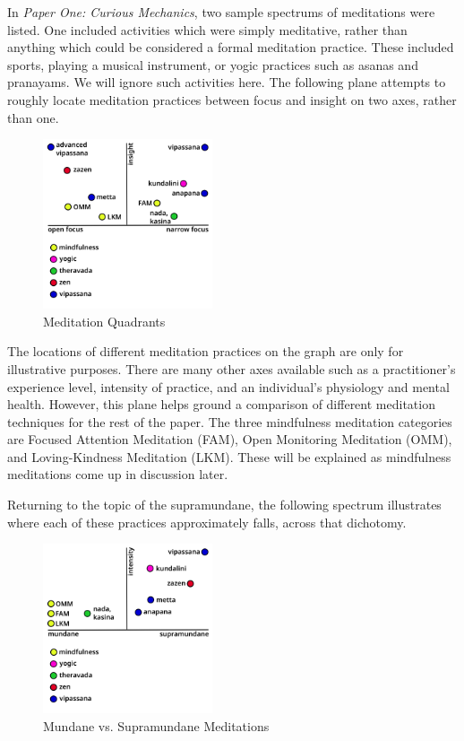 \documentclass[a4paper, amsfonts, amssymb, amsmath, reprint, showkeys, nofootinbib, twoside]{revtex4-1}
\begin{document}
In \textit{Paper One: Curious Mechanics}, two sample spectrums of meditations were
listed. One included activities which were simply meditative, rather than anything
which could be considered a formal meditation practice. These included sports,
playing a musical instrument, or yogic practices such as asanas and pranayams. We
will ignore such activities here. The following plane attempts to roughly locate
meditation practices between focus and insight on two axes, rather than one.

\begin{figure}[H]
  \centering
  \includegraphics[width=5cm]{images/focus-insight-plane.png}
  \caption{Meditation Quadrants}
  \label{fig:meditation-quadrants}
\end{figure}

The locations of different meditation practices on the graph are only for
illustrative purposes. There are many other axes available such as a practitioner's
experience level, intensity of practice, and an individual's physiology and mental
health. However, this plane helps ground a comparison of different meditation
techniques for the rest of the paper. The three mindfulness meditation categories are
Focused Attention Meditation (FAM), Open Monitoring Meditation (OMM), and
Loving-Kindness Meditation (LKM). These will be explained as mindfulness meditations
come up in discussion later.

Returning to the topic of the supramundane, the following spectrum illustrates where
each of these practices approximately falls, across that dichotomy.

\begin{figure}[H]
  \centering
  \includegraphics[width=5cm]{images/mundane-supramundane-plane.png}
  \caption{Mundane vs. Supramundane Meditations}
  \label{fig:mundane-vs-supramundane}
\end{figure}
\end{document}
